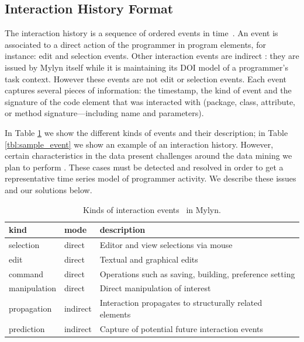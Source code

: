 \documentclass[times]{smrauth}
\begin{document}
\subsection{Interaction History Format}
The interaction history is a sequence of ordered events in time~\cite{YR11}.  An event is associated to a direct action of the programmer in program elements, for instance: edit and selection events. Other interaction events are indirect \cite{KM06}: they are issued by Mylyn itself while it is maintaining its DOI model of a programmer's task context. However these events are not edit or selection events. Each event captures several pieces of information: the timestamp, the kind of event and the signature of the code element that was interacted with (package, class, attribute, or method signature---including name and parameters). 

In Table \ref{tbl:kind_event} we show the different kinds of events and their description; in Table \ref{tbl:sample_event} we show an example of an interaction history. However, certain characteristics in the data present challenges around the data mining we plan to perform \cite{MFR14}. These cases must be detected and resolved in order to get a representative time series model of programmer activity. We describe these issues and our solutions below.


\begin{table}[ht!]
\small
\renewcommand{\arraystretch}{1.3}
\caption{Kinds of interaction events~\cite{KM06} in Mylyn. }
\label{tbl:kind_event}
\centering
\begin{tabular}{|p{1.7cm}|p{1.3cm}|p{8cm}|} 
  \hline 
kind & mode & description \\  
  \hline 
    \hline 
selection & direct &  Editor and view selections via mouse \\
edit & direct & Textual and graphical edits  \\
command & direct & Operations such as saving, building, preference setting  \\
manipulation & direct & Direct manipulation of interest  \\
propagation & indirect & Interaction propagates to structurally related elements  \\
prediction & indirect & Capture of potential future interaction events \\
  \hline
\end{tabular}

\end{table}
\end{document}
